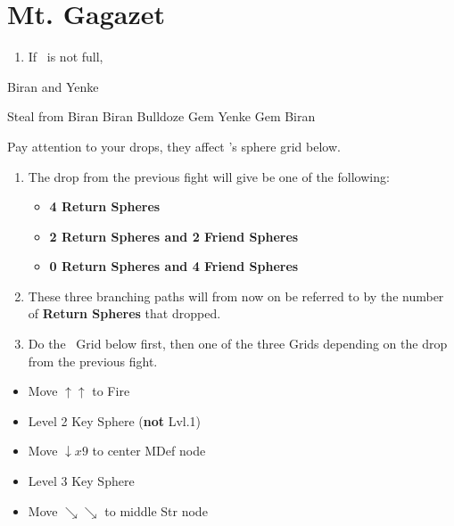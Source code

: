 \chapter{Mt. Gagazet}
\begin{enumerate}
    \item If \kimahri\ is not full, \save
\end{enumerate}
\begin{battle}{Biran and Yenke}
    \begin{itemize}
        \kimahrif Steal from Biran
        \enemyf Biran Bulldoze
        \kimahrif Gem Yenke
        \kimahrif Gem Biran
    \end{itemize}
    Pay attention to your drops, they affect \yuna's sphere grid below.
\end{battle}
\begin{enumerate}[resume]
    \item The drop from the previous fight will give be one of the following:
    \begin{itemize}
        \item \textbf{4 Return Spheres}
        \item \textbf{2 Return Spheres and 2 Friend Spheres}
        \item \textbf{0 Return Spheres and 4 Friend Spheres}
    \end{itemize}
    \item These three branching paths will from now on be referred to by the number of \textbf{Return Spheres} that dropped.
    \item Do the \lulu\ Grid below first, then one of the three Grids depending on the drop from the previous fight.
\end{enumerate}
\begin{spheregrid}[Lulu]
    \begin{itemize}
        \luluf
        \begin{itemize}
            \item Move $\uparrow\uparrow$ to Fire
            \item Level 2 Key Sphere (\textbf{not} Lvl.1)
            \item Move $\downarrow x9$ to center MDef node
            \item Level 3 Key Sphere
            \item Move $\searrow\searrow$ to middle Str node
        \end{itemize}
    \end{itemize}
\end{spheregrid}
